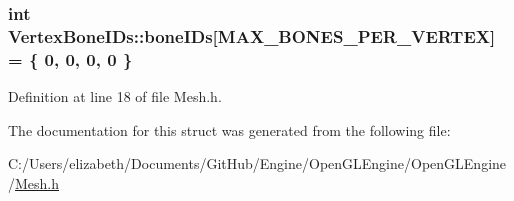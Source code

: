 \subsubsection[{\texorpdfstring{bone\+I\+Ds}{boneIDs}}]{\setlength{\rightskip}{0pt plus 5cm}int Vertex\+Bone\+I\+Ds\+::bone\+I\+Ds\mbox{[}{\bf M\+A\+X\+\_\+\+B\+O\+N\+E\+S\+\_\+\+P\+E\+R\+\_\+\+V\+E\+R\+T\+EX}\mbox{]} = \{ 0, 0, 0, 0 \}}\hypertarget{struct_vertex_bone_i_ds_a61ea9b129c56814ce6b18aefac6ba93a}{}\label{struct_vertex_bone_i_ds_a61ea9b129c56814ce6b18aefac6ba93a}


Definition at line 18 of file Mesh.\+h.



The documentation for this struct was generated from the following file\+:\begin{DoxyCompactItemize}
\item 
C\+:/\+Users/elizabeth/\+Documents/\+Git\+Hub/\+Engine/\+Open\+G\+L\+Engine/\+Open\+G\+L\+Engine/\hyperlink{_mesh_8h}{Mesh.\+h}\end{DoxyCompactItemize}
